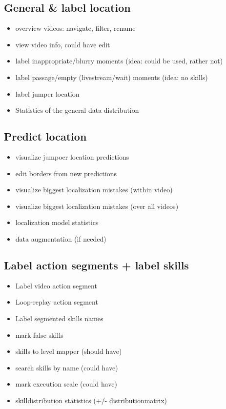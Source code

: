 \subsection{General \& label location}

\begin{itemize}
    \item overview videos: navigate, filter, rename
    \item view video info, could have edit
    \item label inappropriate/blurry moments (idea: could be used, rather not)
    \item label passage/empty (livestream/wait) moments (idea: no skills)
    \item label jumper location
    \item Statistics of the general data distribution
\end{itemize}

\subsection{Predict location}

\begin{itemize}
    \item visualize jumpoer location predictions
    \item edit borders from new predictions
    \item visualize biggest localization mistakes (within video)
    \item visualize biggest localization mistakes (over all videos)
    \item localization model statistics
    \item data augmentation (if needed)
\end{itemize}

\subsection{Label action segments + label skills}

\begin{itemize}
    \item Label video action segment
    \item Loop-replay action segment
    \item Label segmented skills names
    \item mark false skills
    \item skills to level mapper (should have)
    \item search skills by name (could have)
    \item mark execution scale (could have)
    \item skilldistribution statistics (+/- distributionmatrix)
\end{itemize}


